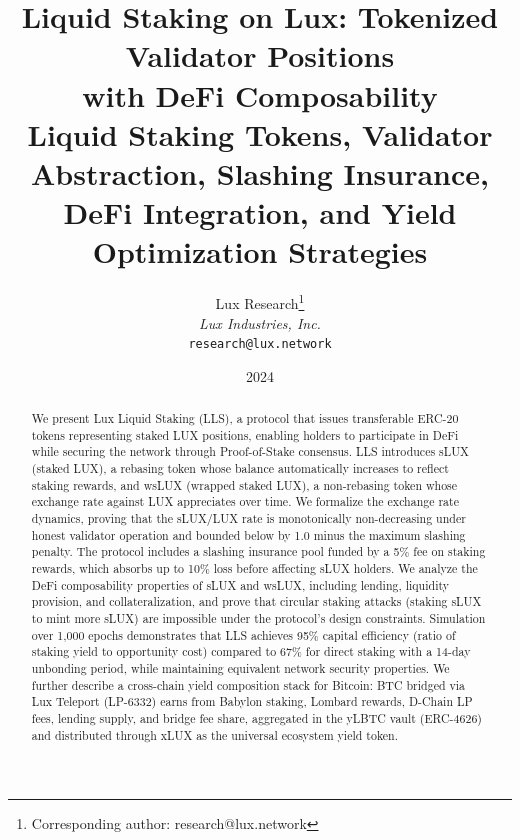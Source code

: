 \documentclass[11pt,a4paper]{article}
\title{\textbf{Liquid Staking on Lux: Tokenized Validator Positions\\with DeFi Composability}\\[6pt]
\large Liquid Staking Tokens, Validator Abstraction, Slashing Insurance,\\DeFi Integration, and Yield Optimization Strategies}
\author{
Lux Research\thanks{Corresponding author: research@lux.network}\\
\textit{Lux Industries, Inc.}\\
\texttt{research@lux.network}
}
\date{2024}
\begin{document}
\luxcoverpage

\begin{abstract}
We present Lux Liquid Staking (LLS), a protocol that issues transferable ERC-20 tokens representing staked LUX positions, enabling holders to participate in DeFi while securing the network through Proof-of-Stake consensus. LLS introduces sLUX (staked LUX), a rebasing token whose balance automatically increases to reflect staking rewards, and wsLUX (wrapped staked LUX), a non-rebasing token whose exchange rate against LUX appreciates over time. We formalize the exchange rate dynamics, proving that the sLUX/LUX rate is monotonically non-decreasing under honest validator operation and bounded below by 1.0 minus the maximum slashing penalty. The protocol includes a slashing insurance pool funded by a 5\% fee on staking rewards, which absorbs up to 10\% loss before affecting sLUX holders. We analyze the DeFi composability properties of sLUX and wsLUX, including lending, liquidity provision, and collateralization, and prove that circular staking attacks (staking sLUX to mint more sLUX) are impossible under the protocol's design constraints. Simulation over 1,000 epochs demonstrates that LLS achieves 95\% capital efficiency (ratio of staking yield to opportunity cost) compared to 67\% for direct staking with a 14-day unbonding period, while maintaining equivalent network security properties. We further describe a cross-chain yield composition stack for Bitcoin: BTC bridged via Lux Teleport (LP-6332) earns from Babylon staking, Lombard rewards, D-Chain LP fees, lending supply, and bridge fee share, aggregated in the yLBTC vault (ERC-4626) and distributed through xLUX as the universal ecosystem yield token.
\end{abstract}
















\end{document}
